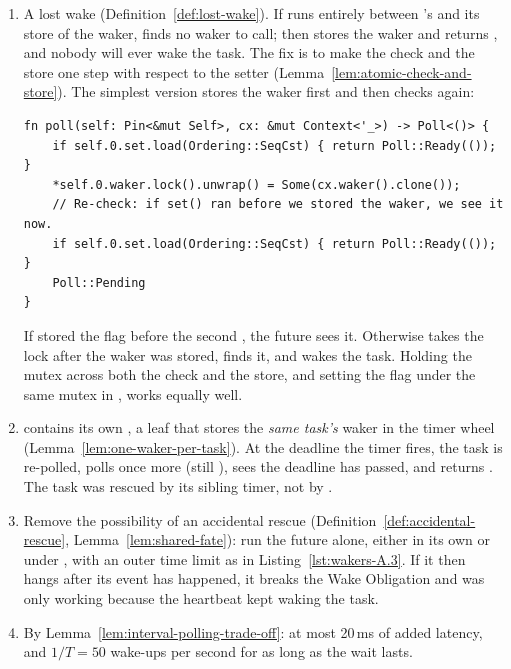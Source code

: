 \begin{Answer}
    \begin{enumerate}
        \item A lost wake (Definition~\ref{def:lost-wake}). If  runs entirely between 's  and its store of the waker,  finds no waker to call;  then stores the waker and returns , and nobody will ever wake the task. The fix is to make the check and the store one step with respect to the setter (Lemma~\ref{lem:atomic-check-and-store}). The simplest version stores the waker first and then checks again:
\begin{lstlisting}
fn poll(self: Pin<&mut Self>, cx: &mut Context<'_>) -> Poll<()> {
    if self.0.set.load(Ordering::SeqCst) { return Poll::Ready(()); }
    *self.0.waker.lock().unwrap() = Some(cx.waker().clone());
    // Re-check: if set() ran before we stored the waker, we see it now.
    if self.0.set.load(Ordering::SeqCst) { return Poll::Ready(()); }
    Poll::Pending
}
\end{lstlisting}
        If  stored the flag before the second , the future sees it. Otherwise  takes the lock after the waker was stored, finds it, and wakes the task. Holding the mutex across both the check and the store, and setting the flag under the same mutex in , works equally well.
        \item {} contains its own , a leaf that stores the \emph{same task's} waker in the timer wheel (Lemma~\ref{lem:one-waker-per-task}). At the deadline the timer fires, the task is re-polled,  polls  once more (still ), sees the deadline has passed, and returns . The task was rescued by its sibling timer, not by .
        \item Remove the possibility of an accidental rescue (Definition~\ref{def:accidental-rescue}, Lemma~\ref{lem:shared-fate}): run the future alone, either in its own  or under , with an outer time limit as in Listing~\ref{lst:wakers-A.3}. If it then hangs after its event has happened, it breaks the Wake Obligation and was only working because the heartbeat kept waking the task.
        \item By Lemma~\ref{lem:interval-polling-trade-off}: at most 20\,ms of added latency, and $1/T = 50$ wake-ups per second for as long as the wait lasts.
    \end{enumerate}
\end{Answer}
